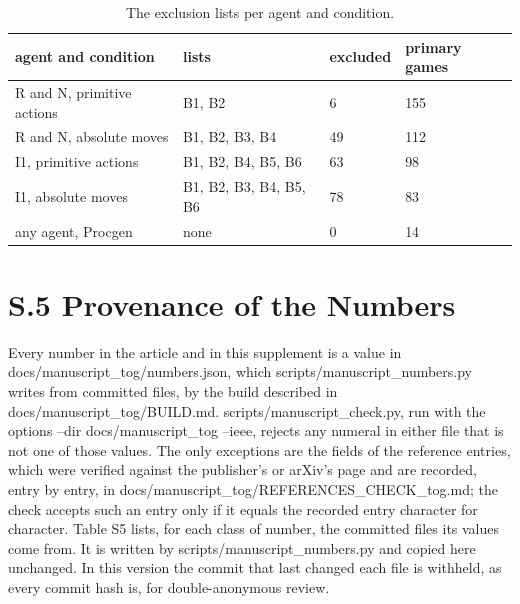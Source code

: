\documentclass[journal,onecolumn]{IEEEtran}
\begin{document}
\begin{table}[!htbp]
\renewcommand{\thetable}{S4}
\caption{The exclusion lists per agent and condition.}
\centering
\footnotesize
\renewcommand{\arraystretch}{1.15}
\setlength{\tabcolsep}{4pt}
\begin{tabular}{llll}
\hline
\textbf{agent and condition} & \textbf{lists} & \textbf{excluded} & \textbf{primary games} \\ \hline
R and N, primitive actions & B1, B2 & 6 & 155 \\
R and N, absolute moves & B1, B2, B3, B4 & 49 & 112 \\
I1, primitive actions & B1, B2, B4, B5, B6 & 63 & 98 \\
I1, absolute moves & B1, B2, B3, B4, B5, B6 & 78 & 83 \\
any agent, Procgen & none & 0 & 14 \\
\hline
\end{tabular}
\end{table}

\section*{S.5 Provenance of the
Numbers}\label{s.5-provenance-of-the-numbers}

Every number in the article and in this supplement is a value in
docs/manuscript\_tog/numbers.json, which scripts/manuscript\_numbers.py
writes from committed files, by the build described in
docs/manuscript\_tog/BUILD.md. scripts/manuscript\_check.py, run with
the options --dir docs/manuscript\_tog --ieee, rejects any numeral in
either file that is not one of those values. The only exceptions are the
fields of the reference entries, which were verified against the
publisher's or arXiv's page and are recorded, entry by entry, in
docs/manuscript\_tog/REFERENCES\_CHECK\_tog.md; the check accepts such
an entry only if it equals the recorded entry character for character.
Table S5 lists, for each class of number, the committed files its values
come from. It is written by scripts/manuscript\_numbers.py and copied
here unchanged. In this version the commit that last changed each file
is withheld, as every commit hash is, for double-anonymous review.
\end{document}
